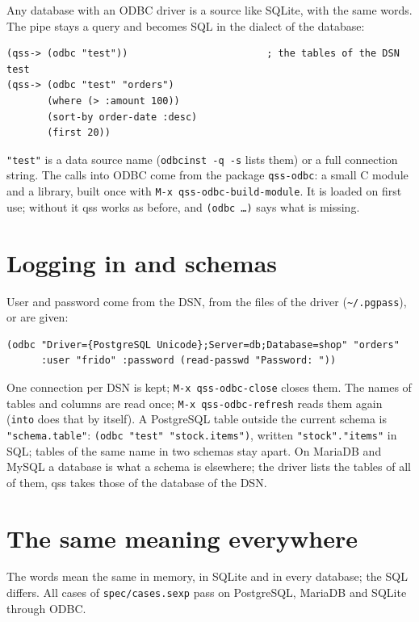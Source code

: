 \documentclass[
  paper=a4, fontsize=11pt, parskip=half, headings=small,
  toc=bibliography, numbers=noenddot, DIV=12
]{scrreprt}
\newcommand{\code}[1]{\texttt{#1}}
\newcommand{\file}[1]{\texttt{#1}}
\newcommand{\kbd}[1]{\texttt{#1}}
\newcommand{\qss}{\textsf{qss}}
\begin{document}
Any database with an ODBC driver is a source like SQLite, with the same words.
The pipe stays a query and becomes SQL in the dialect of the database:

\begin{Verbatim}
(qss-> (odbc "test"))                        ; the tables of the DSN test
(qss-> (odbc "test" "orders")
       (where (> :amount 100))
       (sort-by order-date :desc)
       (first 20))
\end{Verbatim}

\code{"test"} is a data source name (\kbd{odbcinst -q -s} lists them) or a
full connection string. The calls into ODBC come from the package
\file{qss-odbc}: a small C module and a library, built once with
\kbd{M-x qss-odbc-build-module}. It is loaded on first use; without it \qss{}
works as before, and \code{(odbc \ldots)} says what is missing.

\section{Logging in and schemas}

User and password come from the DSN, from the files of the driver
(\file{\textasciitilde/.pgpass}), or are given:

\begin{Verbatim}
(odbc "Driver={PostgreSQL Unicode};Server=db;Database=shop" "orders"
      :user "frido" :password (read-passwd "Password: "))
\end{Verbatim}

One connection per DSN is kept; \kbd{M-x qss-odbc-close} closes them. The
names of tables and columns are read once; \kbd{M-x qss-odbc-refresh} reads
them again (\code{into} does that by itself). A PostgreSQL table outside the
current schema is \code{"schema.table"}: \code{(odbc "test" "stock.items")},
written \code{"stock"."items"} in SQL; tables of the same name in two schemas
stay apart. On MariaDB and MySQL a database is what a schema is elsewhere; the
driver lists the tables of all of them, qss takes those of the database of the
DSN.

\section{The same meaning everywhere}

The words mean the same in memory, in SQLite and in every database; the SQL
differs. All cases of \file{spec/cases.sexp} pass on PostgreSQL, MariaDB and
SQLite through ODBC.
\end{document}
